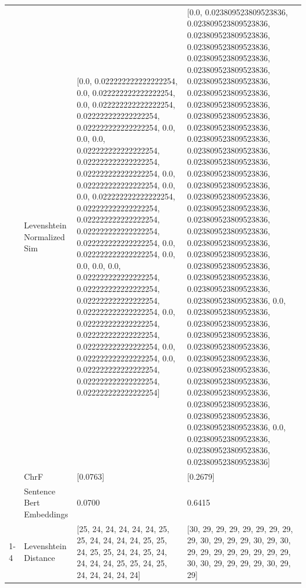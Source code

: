 \begin{tabular}{llll}
 & Levenshtein Normalized Sim & [0.0, 0.022222222222222254, 0.0, 0.022222222222222254, 0.0, 0.022222222222222254, 0.022222222222222254, 0.022222222222222254, 0.0, 0.0, 0.0, 0.022222222222222254, 0.022222222222222254, 0.022222222222222254, 0.0, 0.022222222222222254, 0.0, 0.0, 0.022222222222222254, 0.022222222222222254, 0.022222222222222254, 0.022222222222222254, 0.022222222222222254, 0.0, 0.022222222222222254, 0.0, 0.0, 0.0, 0.0, 0.022222222222222254, 0.022222222222222254, 0.022222222222222254, 0.022222222222222254, 0.0, 0.022222222222222254, 0.022222222222222254, 0.022222222222222254, 0.0, 0.022222222222222254, 0.0, 0.022222222222222254, 0.022222222222222254, 0.022222222222222254] & [0.0, 0.023809523809523836, 0.023809523809523836, 0.023809523809523836, 0.023809523809523836, 0.023809523809523836, 0.023809523809523836, 0.023809523809523836, 0.023809523809523836, 0.023809523809523836, 0.023809523809523836, 0.023809523809523836, 0.023809523809523836, 0.023809523809523836, 0.023809523809523836, 0.023809523809523836, 0.023809523809523836, 0.023809523809523836, 0.023809523809523836, 0.023809523809523836, 0.023809523809523836, 0.023809523809523836, 0.023809523809523836, 0.023809523809523836, 0.023809523809523836, 0.023809523809523836, 0.023809523809523836, 0.0, 0.023809523809523836, 0.023809523809523836, 0.023809523809523836, 0.023809523809523836, 0.023809523809523836, 0.023809523809523836, 0.023809523809523836, 0.023809523809523836, 0.023809523809523836, 0.023809523809523836, 0.023809523809523836, 0.0, 0.023809523809523836, 0.023809523809523836, 0.023809523809523836] \\
 & ChrF & [0.0763] & [0.2679] \\
 & Sentence Bert Embeddings & 0.0700 & 0.6415 \\
\cline{1-4}
\multirow[t]{4}{*}{Kumenya muno ni kumenyuka} & Levenshtein Distance & [25, 24, 24, 24, 24, 24, 25, 25, 24, 24, 24, 24, 25, 25, 24, 25, 25, 24, 24, 25, 24, 24, 24, 24, 25, 25, 24, 25, 24, 24, 24, 24, 24] & [30, 29, 29, 29, 29, 29, 29, 29, 29, 30, 29, 29, 29, 30, 29, 30, 29, 29, 29, 29, 29, 29, 29, 29, 30, 30, 29, 29, 29, 29, 30, 29, 29] \\

\end{tabular}
